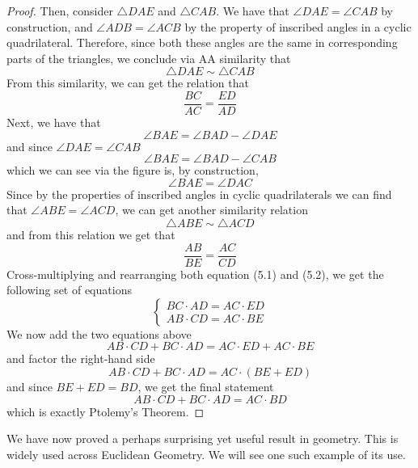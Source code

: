\begin{proof}
Then, consider $\triangle DAE$ and $\triangle CAB$. We have that $\angle DAE = \angle CAB$ by construction, and $\angle ADB = \angle ACB$ by the property of inscribed angles in a cyclic quadrilateral. Therefore, since both these angles are the same in corresponding parts of the triangles, we conclude via AA similarity that 
\[
\triangle DAE \sim \triangle CAB
\]
From this similarity, we can get the relation that
\begin{equation}
\frac{BC}{AC} = \frac{ED}{AD}
\end{equation}
Next, we have that
\[
\angle BAE = \angle BAD - \angle DAE
\]
and since $\angle DAE = \angle CAB$
\[
\angle BAE = \angle BAD - \angle CAB
\]
which we can see via the figure is, by construction, 
\[
\angle BAE = \angle DAC
\]
Since by the properties of inscribed angles in cyclic quadrilaterals we can find that $\angle ABE = \angle ACD$, we can get another similarity relation
\[
\triangle ABE \sim \triangle ACD
\]
and from this relation we get that
\begin{equation}
\frac{AB}{BE} = \frac{AC}{CD}
\end{equation}
Cross-multiplying and rearranging both equation (5.1) and (5.2), we get the following set of equations
\[
\begin{cases}
BC \cdot AD = AC \cdot ED \\
AB \cdot CD = AC\cdot BE
\end{cases}
\]
We now add the two equations above
\[
AB\cdot CD + BC\cdot AD = AC\cdot ED + AC\cdot BE
\]
and factor the right-hand side
\[
AB\cdot CD + BC\cdot AD = AC \cdot (BE + ED)
\]
and since $BE + ED = BD$, we get the final statement
\[
AB\cdot CD + BC\cdot AD = AC \cdot BD
\]
which is exactly Ptolemy's Theorem.
\end{proof}

We have now proved a perhaps surprising yet useful result in geometry. This is widely used across Euclidean Geometry. We will see one such example of its use.

